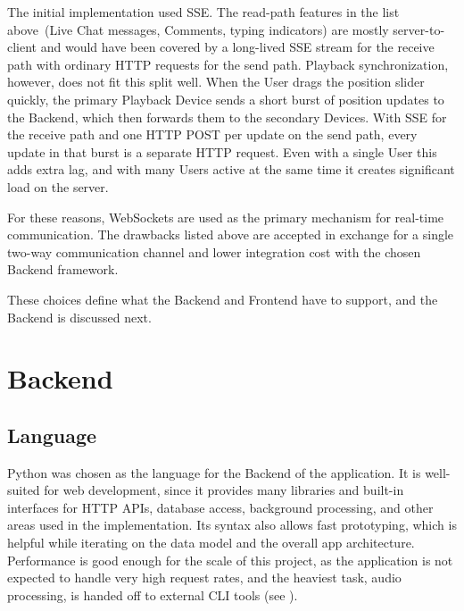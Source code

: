 The initial implementation used SSE\@.
The read-path features in the list above~(Live Chat messages, Comments, typing indicators) are
mostly server-to-client and would have been covered by a long-lived SSE stream for the receive
path with ordinary HTTP requests for the send path.
Playback synchronization, however, does not fit this split well.
When the User drags the position slider quickly, the primary Playback Device sends a short burst
of position updates to the Backend, which then forwards them to the secondary Devices.
With SSE for the receive path and one HTTP POST per update on the send path, every update in
that burst is a separate HTTP request.
Even with a single User this adds extra lag, and with many Users active at the same time it creates
significant load on the server.

For these reasons, WebSockets are used as the primary mechanism for real-time communication.
The drawbacks listed above are accepted in exchange for a single two-way communication channel and
lower integration cost with the chosen Backend framework.

These choices define what the Backend and Frontend have to support, and the Backend is discussed next.


\section{Backend}

\subsection{Language}
Python was chosen as the language for the Backend of the application.
It is well-suited for web development, since it provides many libraries and
built-in interfaces for HTTP APIs, database access, background processing, and
other areas used in the implementation.
Its syntax also allows fast prototyping, which is helpful while iterating on
the data model and the overall app architecture.
Performance is good enough for the scale of this project, as the application
is not expected to handle very high request rates, and the heaviest task,
audio processing, is handed off to external CLI tools
(see ).

